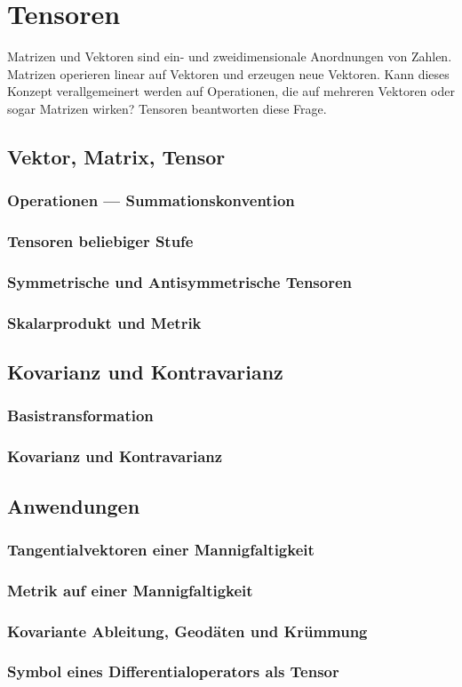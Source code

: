 %
%
%
\chapter{Tensoren}
Matrizen und Vektoren sind ein- und zweidimensionale Anordnungen von
Zahlen.
Matrizen operieren linear auf Vektoren und erzeugen neue Vektoren.
Kann dieses Konzept verallgemeinert werden auf Operationen, die
auf mehreren Vektoren oder sogar Matrizen wirken?
Tensoren beantworten diese Frage.


\section{Vektor, Matrix, Tensor}
\subsection{Operationen --- Summationskonvention}
\subsection{Tensoren beliebiger Stufe}
\subsection{Symmetrische und Antisymmetrische Tensoren}
\subsection{Skalarprodukt und Metrik}

\section{Kovarianz und Kontravarianz}
\subsection{Basistransformation}
\subsection{Kovarianz und Kontravarianz}

\section{Anwendungen}
\subsection{Tangentialvektoren einer Mannigfaltigkeit}
\subsection{Metrik auf einer Mannigfaltigkeit}
\subsection{Kovariante Ableitung, Geodäten und Krümmung}
\subsection{Symbol eines Differentialoperators als Tensor}

